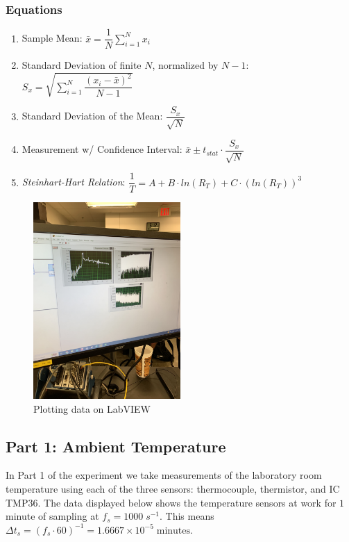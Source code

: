 \documentclass{article}
\begin{document}
\subsubsection*{Equations}
\begin{enumerate}[label = \Roman*.]
    \item Sample Mean: \(\bar{x} = \dfrac{1}{N}\displaystyle\sum_{i=1}^{N} x_{i}\) 
    \item Standard Deviation of finite $N$, normalized by $N-1$: \(S_{x} = \sqrt{\displaystyle\sum_{i=1}^{N} \dfrac{(x_{i} - \bar{x})^{2}}{N-1}}\)
    \item Standard Deviation of the Mean: \(\dfrac{S_{x}}{\sqrt{N}}\)
    \item Measurement w/ Confidence Interval: \(\bar{x} \pm t_{stat}\cdot \dfrac{S_{x}}{\sqrt{N}}\)
    \item \textit{Steinhart-Hart Relation}: \(\dfrac{1}{T} = A + B\cdot ln(R_{T}) + C\cdot (ln(R_{T}))^{3}\)
\end{enumerate}
 
\begin{figure}[H]
\centering
\includegraphics[width=0.5\textwidth, angle = -90]{Lab 2/lab2images/labview_plots.jpg}
\caption{Plotting data on LabVIEW}
\end{figure}

\subsection{Part 1: Ambient Temperature}
In Part 1 of the experiment we take measurements of the laboratory room temperature using each of the three sensors: thermocouple, thermistor, and IC TMP36. The data displayed below shows the temperature sensors at work for $1$ minute of sampling at $f_{s} = 1000\; s^{-1}$. This means $\Delta t_{s} = (f_{s}\cdot 60)^{-1} = 1.6667\times10^{-5}\; \text{minutes}$.
\end{document}
